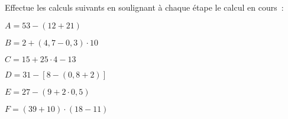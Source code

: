 \begin{exercice}
Effectue les calculs suivants en soulignant à chaque étape le calcul en cours :
 \begin{colitemize}{2}
 \item $A = 53 - (12 + 21)$	
 
 \dotfill

 \dotfill

 \dotfill

 \item {\small $B = 2 + (4,7 - 0,3) \cdot 10$}	

 \dotfill

 \dotfill

 \dotfill
	
 \item $C= 15 + 25 \cdot 4 - 13$      	

 \dotfill

 \dotfill

 \dotfill
	
 \item {\small $D = 31 - [8 - (0,8 + 2)]$}
	
 \dotfill

 \dotfill

 \dotfill
	
 \item $E = 27 - (9 + 2 \cdot 0,5)$	

 \dotfill

 \dotfill

 \dotfill
	
 \item {\small $F = (39 + 10) \cdot (18 - 11)$}
 
 \dotfill

 \dotfill

 \dotfill
\end{colitemize}
\end{exercice}


